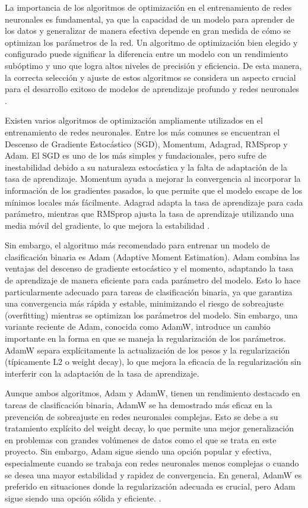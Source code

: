 La importancia de los algoritmos de optimización en el entrenamiento de redes neuronales es fundamental, ya que la capacidad de un modelo para aprender de los datos y generalizar de manera efectiva depende en gran medida de cómo se optimizan los parámetros de la red. Un algoritmo de optimización bien elegido y configurado puede significar la diferencia entre un modelo con un rendimiento subóptimo y uno que logra altos niveles de precisión y eficiencia. De esta manera, la correcta selección y ajuste de estos algoritmos se considera un aspecto crucial para el desarrollo exitoso de modelos de aprendizaje profundo y redes neuronales \cite{goodfellow2016deep}.

Existen varios algoritmos de optimización ampliamente utilizados en el entrenamiento de redes neuronales. Entre los más comunes se encuentran el Descenso de Gradiente Estocástico (SGD), Momentum, Adagrad, RMSprop y Adam. El SGD es uno de los más simples y fundacionales, pero sufre de inestabilidad debido a su naturaleza estocástica y la falta de adaptación de la tasa de aprendizaje. Momentum ayuda a mejorar la convergencia al incorporar la información de los gradientes pasados, lo que permite que el modelo escape de los mínimos locales más fácilmente. Adagrad adapta la tasa de aprendizaje para cada parámetro, mientras que RMSprop ajusta la tasa de aprendizaje utilizando una media móvil del gradiente, lo que mejora la estabilidad \cite{bottou2010large}.

Sin embargo, el algoritmo más recomendado para entrenar un modelo de clasificación binaria es Adam (Adaptive Moment Estimation). Adam combina las ventajas del descenso de gradiente estocástico y el momento, adaptando la tasa de aprendizaje de manera eficiente para cada parámetro del modelo. Esto lo hace particularmente adecuado para tareas de clasificación binaria, ya que garantiza una convergencia más rápida y estable, minimizando el riesgo de sobreajuste (overfitting) mientras se optimizan los parámetros del modelo. Sin embargo, una variante reciente de Adam, conocida como AdamW, introduce un cambio importante en la forma en que se maneja la regularización de los parámetros. AdamW separa explícitamente la actualización de los pesos y la regularización (típicamente L2 o weight decay), lo que mejora la eficacia de la regularización sin interferir con la adaptación de la tasa de aprendizaje.

Aunque ambos algoritmos, Adam y AdamW, tienen un rendimiento destacado en tareas de clasificación binaria, AdamW se ha demostrado más eficaz en la prevención de sobreajuste en redes neuronales complejas. Esto se debe a su tratamiento explícito del weight decay, lo que permite una mejor generalización en problemas con grandes volúmenes de datos como el que se trata en este proyecto. Sin embargo, Adam sigue siendo una opción popular y efectiva, especialmente cuando se trabaja con redes neuronales menos complejas o cuando se desea una mayor estabilidad y rapidez de convergencia. En general, AdamW es preferido en situaciones donde la regularización adecuada es crucial, pero Adam sigue siendo una opción sólida y eficiente. \cite{kingma2014adam}.



